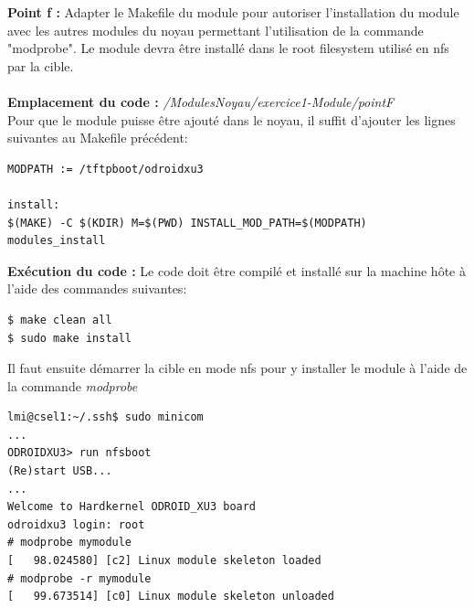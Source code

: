 \textbf{Point f :} Adapter	le	Makefile	du	module	pour	autoriser	l’installation	du	module	avec	les	autres	modules	du	noyau	permettant	l’utilisation	de	la	commande	"modprobe".	Le	module	devra	être	installé	dans	le	root	filesystem	utilisé	en	nfs	par	la	cible.\\\\
\textbf{Emplacement du code : } \textit{/ModulesNoyau/exercice1-Module/pointF}\\
Pour que le module puisse être ajouté dans le noyau, il suffit d'ajouter les lignes suivantes au Makefile précédent:
\begin{lstlisting}
MODPATH := /tftpboot/odroidxu3

install:
$(MAKE) -C $(KDIR) M=$(PWD) INSTALL_MOD_PATH=$(MODPATH) modules_install
\end{lstlisting}
\textbf{Exécution du code : }Le code doit être compilé et installé sur la machine hôte à l'aide des commandes suivantes:
\begin{lstlisting}
$ make clean all
$ sudo make install
\end{lstlisting}
Il faut ensuite démarrer la cible en mode nfs pour y installer le module à l'aide de la commande \textit{modprobe}
\begin{lstlisting}
lmi@csel1:~/.ssh$ sudo minicom
...
ODROIDXU3> run nfsboot
(Re)start USB...
...
Welcome to Hardkernel ODROID_XU3 board                                          
odroidxu3 login: root  
# modprobe mymodule                                                             
[   98.024580] [c2] Linux module skeleton loaded                                
# modprobe -r mymodule                                                          
[   99.673514] [c0] Linux module skeleton unloaded   
\end{lstlisting}
